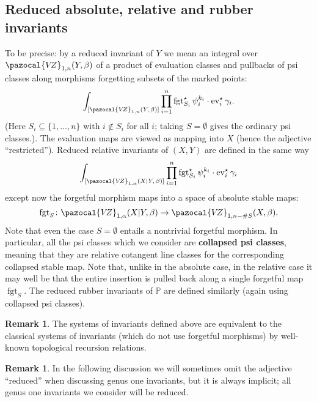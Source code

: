 \documentclass[11pt]{amsart}
\newcommand{\VZ}{\pazocal{V\!Z}}
\renewcommand{\to}{\rightarrow}
\newcommand{\ev}{\operatorname{ev}}
\newcommand{\fgt}{\operatorname{fgt}}
\theoremstyle{definition}
\theoremstyle{definition}
\newtheorem{remark}[thm]{Remark}
\begin{document}
\subsection{Reduced absolute, relative and rubber invariants} To be precise: by a reduced invariant of $Y$ we mean an integral over $\VZ_{1,n}(Y,\beta)$ of a product of evaluation classes and pullbacks of psi classes along morphisms forgetting subsets of the marked points:
\begin{equation*} \int_{[\VZ_{1,n}(Y,\, \beta)]} \prod_{i=1}^n \fgt_{S_i}^\star \psi_i^{k_i} \cdot \ev_i^\star \gamma_i.\end{equation*}
(Here $S_i \subseteq \{1,\ldots,n\}$ with $i \not\in S_i$ for all $i$; taking $S=\emptyset$ gives the ordinary  psi classes.). The evaluation maps are viewed as mapping into $X$ (hence the adjective ``restricted''). Reduced relative invariants of $(X,Y)$ are defined in the same way
\begin{equation*} \int_{[\VZ_{1,\alpha}(X|Y,\, \beta)]} \prod_{i=1}^n \fgt_{S_i}^\star \psi_i^{k_i} \cdot \ev_i^\star \gamma_i\end{equation*}
except now the forgetful morphism maps into a space of absolute stable maps:
\begin{equation*} \fgt_S \colon \VZ_{1,\alpha}(X|Y,\beta) \to \VZ_{1,n-\#S}(X,\beta).\end{equation*}
Note that even the case $S=\emptyset$ entails a nontrivial forgetful morphism. In particular, all the psi classes which we consider are \textbf{collapsed psi classes}, meaning that they are relative cotangent line classes for the corresponding collapsed stable map. Note that, unlike in the absolute case, in the relative case it may well be that the entire insertion is pulled back along a single forgetful map $\fgt_S$. The reduced rubber invariants of $\mathbb{P}$ are defined similarly (again using collapsed psi classes).

\begin{remark}The systems of invariants defined above are equivalent to the classical systems of invariants (which do not use forgetful morphisms) by well-known topological recursion relations.\end{remark}

\begin{remark} In the following discussion we will sometimes omit the adjective ``reduced'' when discussing genus one invariants, but it is always implicit; all genus one invariants we consider will be reduced.\end{remark}
\end{document}
